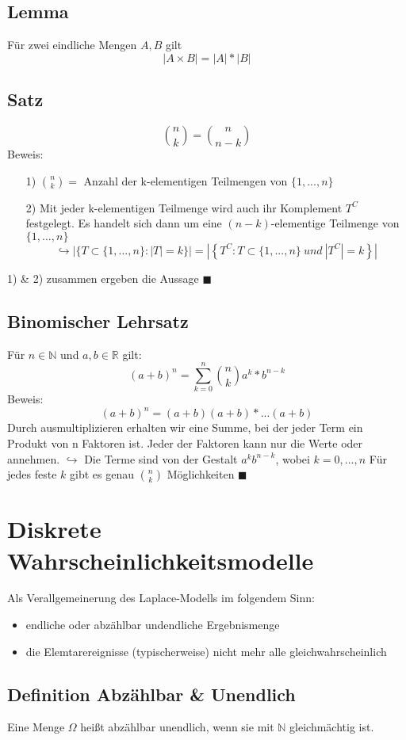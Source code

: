 \documentclass[12pt,a4paper]{article}
\begin{document}
	\subsection{Lemma}
	Für zwei eindliche Mengen $A,B$ gilt
	$$|A\times B| = |A|*|B|$$
	\subsection{Satz}
	$$\binom{n}{k}=\binom{n}{n-k}$$
	Beweis: 
	\begin{itemize}
		\item[1) ] $\binom{n}{k}=$ Anzahl der k-elementigen Teilmengen von $\{1,...,n\}$
		\item[2) ] Mit jeder k-elementigen Teilmenge wird auch ihr Komplement $T^C$ festgelegt. Es handelt sich 
		dann um eine $(n-k)$-elementige Teilmenge von $\{1,...,n\}$
		$$\hookrightarrow |\{T\subset\{1,...,n\}:|T|=k\}|=
		|\left\{T^C:T\subset\{1,...,n\}\: und \: |T^C|=k\right\}|$$		
	\end{itemize}
	1) \& 2) zusammen ergeben die Aussage $\blacksquare$
	\subsection{Binomischer Lehrsatz}
	Für $n\in\mathbb{N}$ und $a,b\in\mathbb{R}$ gilt:
	$$(a+b)^n=\sum_{k=0}^n \binom{n}{k}a^k*b^{n-k}$$
	Beweis:
	$$(a+b)^n=(a+b)(a+b)*...(a+b)$$
	Durch ausmultiplizieren erhalten wir eine Summe, bei der jeder Term ein Produkt von n Faktoren ist. Jeder
	der Faktoren kann nur die Werte  oder  annehmen. \newline
	$\hookrightarrow$ Die Terme sind von der Gestalt $a^k b^{n-k}$, wobei $k=0,...,n$
	Für jedes feste $k$ gibt es genau $\binom{n}{k}$ Möglichkeiten $\blacksquare$
\section{Diskrete Wahrscheinlichkeitsmodelle}
	Als Verallgemeinerung des Laplace-Modells im folgendem Sinn:
	\begin{itemize}
		\item endliche oder abzählbar undendliche Ergebnismenge
		\item die Elemtarereignisse (typischerweise) nicht mehr alle \newline 
		gleichwahrscheinlich
	\end{itemize}
	\subsection{Definition Abzählbar \& Unendlich}
	Eine Menge $\Omega$ heißt abzählbar unendlich, wenn sie mit $\mathbb{N}$ gleichmächtig ist.
\end{document}
